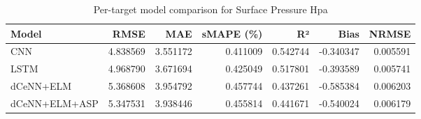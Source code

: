 \begin{table}
\caption{Per-target model comparison for Surface Pressure Hpa}
\begin{tabular}{lrrrrrr}
\toprule
Model & RMSE & MAE & sMAPE (\%) & R² & Bias & NRMSE \\
\midrule
CNN & 4.838569 & 3.551172 & 0.411009 & 0.542744 & -0.340347 & 0.005591 \\
LSTM & 4.968790 & 3.671694 & 0.425049 & 0.517801 & -0.393589 & 0.005741 \\
dCeNN+ELM & 5.368608 & 3.954792 & 0.457744 & 0.437261 & -0.585384 & 0.006203 \\
dCeNN+ELM+ASP & 5.347531 & 3.938446 & 0.455814 & 0.441671 & -0.540024 & 0.006179 \\
\bottomrule
\end{tabular}
\end{table}
